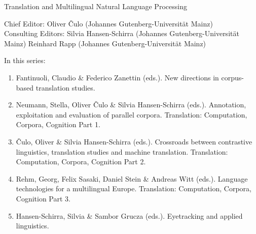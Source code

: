 {\large Translation and Multilingual Natural Language Processing}

\bigskip

Chief Editor: Oliver \v{C}ulo (Johannes Gutenberg-Universität Mainz) \\
Consulting Editors: Silvia Hansen-Schirra (Johannes Gutenberg-Universität Mainz)
Reinhard Rapp (Johannes Gutenberg-Universität Mainz)

\bigskip

In this series:

\begin{enumerate}
\item Fantinuoli, Claudio \& Federico Zanettin (eds.). New directions in corpus-based translation studies.
\item Neumann, Stella, Oliver Čulo \& Silvia Hansen-Schirra (eds.). Annotation, exploitation and evaluation of parallel corpora. Translation: Computation, Corpora, Cognition Part 1.
\item Čulo, Oliver  \& Silvia Hansen-Schirra (eds.). Crossroads between contrastive linguistics, translation studies and machine translation. Translation: Computation, Corpora, Cognition Part 2.
\item Rehm, Georg, Felix Sasaki, Daniel Stein \& Andreas Witt (eds.). Language technologies for a multilingual Europe. Translation: Computation, Corpora, Cognition Part 3.
\item Hansen-Schirra, Silvia \& Sambor Grucza (eds.). Eyetracking and applied linguistics.
\end{enumerate}

 
